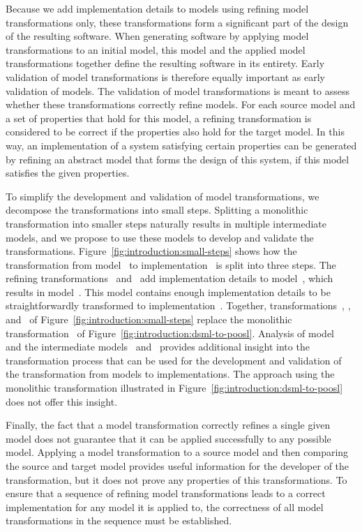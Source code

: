 Because we add implementation details to models using refining model transformations only, these transformations form a significant part of the design of the resulting software.
When generating software by applying model transformations to an initial model, this model and the applied model transformations together define the resulting software in its entirety.
Early validation of model transformations is therefore equally important as early validation of models.
The validation of model transformations is meant to assess whether these transformations correctly refine models.
For each source model and a set of properties that hold for this model, a refining transformation is considered to be correct if the properties also hold for the target model.
In this way, an implementation of a system satisfying certain properties can be generated by refining an abstract model that forms the design of this system, if this model satisfies the given properties.

To simplify the development and validation of model transformations, we decompose the transformations into small steps.
Splitting a monolithic transformation into smaller steps naturally results in multiple intermediate models, and we propose to use these models to develop and validate the transformations.
Figure~\ref{fig:introduction:small-steps} shows how the transformation from model~ to implementation~\Implementation{} is split into three steps.
The refining transformations~ and~ add implementation details to model~, which results in model~.
This model contains enough implementation details to be straightforwardly transformed to implementation~\Implementation{}.
Together, transformations~, , and~ of Figure~\ref{fig:introduction:small-steps} replace the monolithic transformation~ of Figure~\ref{fig:introduction:dsml-to-poosl}.
Analysis of model~ and the intermediate models~ and~ provides additional insight into the transformation process that can be used for the development and validation of the transformation from \SLCO models to implementations.
The approach using the monolithic transformation illustrated in Figure~\ref{fig:introduction:dsml-to-poosl} does not offer this insight.

Finally, the fact that a model transformation correctly refines a single given model does not guarantee that it can be applied successfully to any possible model.
Applying a model transformation to a source model and then comparing the source and target model provides useful information for the developer of the transformation, but it does not prove any properties of this transformations.
To ensure that a sequence of refining model transformations leads to a correct implementation for any model it is applied to, the correctness of all model transformations in the sequence must be established. 